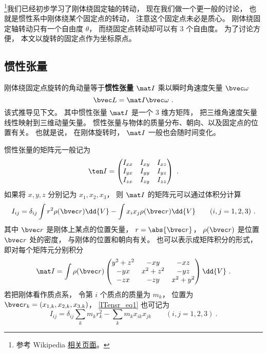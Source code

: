 
\begin{issues}
\issueTODO
\end{issues}


\footnote{参考 Wikipedia \href{https://en.wikipedia.org/wiki/Moment_of_inertia}{相关页面}。}我们已经初步学习了刚体绕固定轴的转动， 现在我们做一个更一般的讨论， 也就是惯性系中刚体绕某个固定点的转动， 注意这个固定点未必是质心。 刚体绕固定轴转动只有一个自由度 $\theta$， 而绕固定点转动却可以有 3 个自由度。 为了讨论方便， 本文以旋转的固定点作为坐标原点。

\subsection{惯性张量}
刚体绕固定点旋转的角动量等于\textbf{惯性张量} $\mat I$ 乘以瞬时角速度矢量 $\bvec \omega$
\begin{equation}\label{ITensr_eq3}
\bvec L = \mat I \bvec \omega~.
\end{equation}
该式推导见下文。 其中惯性张量 $\mat I$ 是一个 3 维方矩阵， 把三维角速度矢量线性映射到三维动量矢量。 惯性张量与物体的质量分布、朝向、以及固定点的位置有关。 也就是说， 在刚体旋转时， $\mat I$ 一般也会随时间变化。

惯性张量的矩阵元一般记为
\begin{equation}
\ten I = \begin{pmatrix}
I_{xx}& I_{xy}& I_{xz} \\
I_{yx}& I_{yy}& I_{yz} \\
I_{zx}& I_{zy}& I_{zz}
\end{pmatrix}~.
\end{equation}
如果将 $x, y, z$ 分别记为 $x_1, x_2, x_3$， 则 $\mat I$ 的矩阵元可以通过体积分计算
\begin{equation}\label{ITensr_eq1}
I_{ij} = \delta_{ij} \int r^2 \rho(\bvec r)\dd{V} - \int x_i x_j \rho(\bvec r)\dd{V} \qquad (i, j = 1, 2, 3)~.
\end{equation}
其中 $\bvec r$ 是刚体上某点的位置矢量， $r = \abs{\bvec r}$， $\rho(\bvec r)$ 是位置 $\bvec r$ 处的密度， 与刚体的位置和朝向有关。 也可以表示成矩阵积分的形式， 即对每个矩阵元分别积分
\begin{equation}\label{ITensr_eq2}
\mat I = \int \rho(\bvec r)
\begin{pmatrix}
y^2 + z^2 & -xy & -xz\\
-yx & x^2 + z^2 & -yz\\
-zx & -zy & x^2 + y^2
\end{pmatrix}
\dd{V}~.
\end{equation}
若把刚体看作质点系， 令第 $i$ 个质点的质量为 $m_k$， 位置为 $\bvec r_{k} = (x_{1,k},x_{2,k},x_{3,k})$， \autoref{ITensr_eq1} 也可记为
\begin{equation}\label{ITensr_eq8}
I_{ij} = \delta_{ij}\sum_k m_k r_k^2 - \sum_k m_k x_{ik}x_{jk} \qquad (i, j = 1, 2, 3)~.
\end{equation}


